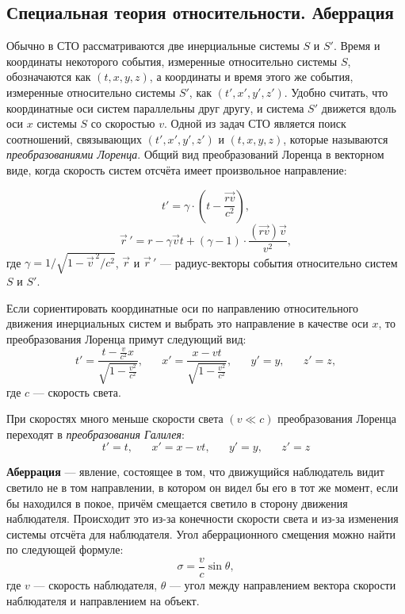 \subsection{Специальная теория относительности. Аберрация}

Обычно в СТО рассматриваются две инерциальные системы $S$ и $S'$. Время и координаты некоторого события, измеренные относительно системы $S$, обозначаются как $(t, x, y, z)$, а координаты и время этого же события, измеренные относительно системы $S'$, как $(t', x', y', z')$. Удобно считать, что координатные оси систем параллельны друг другу, и система $S'$ движется вдоль оси $x$ системы $S$ со скоростью $v$. Одной из задач СТО является поиск соотношений, связывающих $(t', x', y', z')$ и $(t, x, y, z)$, которые называются \textit{преобразованиями Лоренца}. Общий вид преобразований Лоренца в векторном виде, когда скорость систем отсчёта имеет произвольное направление:

\begin{equation}
t'=\gamma\cdot \left(t-\frac{\vec{rv}}{c^2}\right),
\end{equation}
\begin{equation}
\vec{r}\,'=r-\gamma \vec{v}t+(\gamma-1)\cdot\frac{(\vec{rv})\vec{v}}{v^2},
\end{equation}
где  $\gamma=1/{\sqrt {1-\vec{v}^{\,2}/c^{2}}}$, $\vec{r}$ и $\vec{r}\,'$ --- радиус-векторы события относительно систем $S$ и $S'$.

Если сориентировать координатные оси по направлению относительного движения инерциальных систем и выбрать это направление в качестве оси $x$, то преобразования Лоренца примут следующий вид: 
\begin{equation}
t'=\frac{t-\frac{v}{c^2}x}{\sqrt{1-\frac{v^2}{c^2}}},\quad\text{  } x'=\frac{x-vt}{\sqrt{1-\frac{v^2}{c^2}}},\quad\text{  } y'=y,\quad\text{  } z'=z,
\end{equation}
где $c$ --- скорость света.

 При скоростях много меньше скорости света $(v\ll c)$ преобразования Лоренца переходят в \textit{преобразования Галилея}:
\begin{equation}
 t'=t,\quad\text{  } x'=x-vt,\quad\text{  }  y'=y,\quad\text{  }  z'=z
\end{equation}
 
\textbf{Аберрация} --- явление, состоящее в том, что движущийся наблюдатель видит светило не в том направлении, в котором он видел бы его в тот же момент, если бы находился в покое, причём смещается светило в сторону движения наблюдателя. Происходит это из-за конечности скорости света и из-за изменения системы отсчёта для наблюдателя.  
Угол аберрационного смещения можно найти по следующей формуле:
\begin{equation}\sigma=\frac{v}{c}\sin\theta,
\end{equation}
где $v$ --- скорость наблюдателя, $\theta$ --- угол между направлением вектора скорости наблюдателя и направлением на объект. 